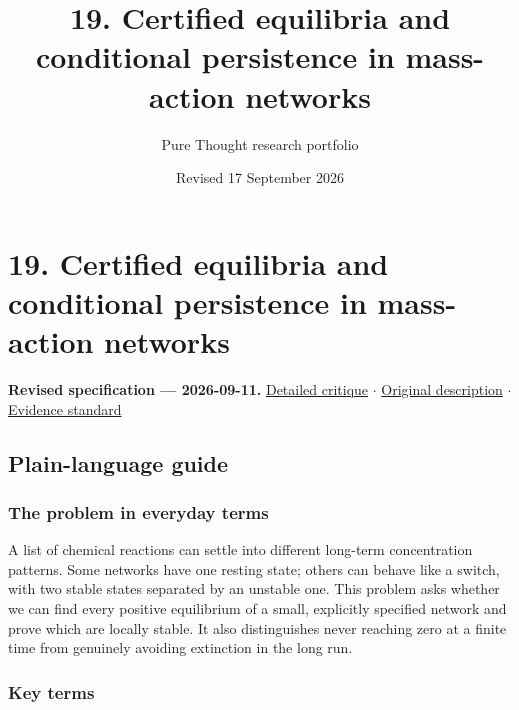 \documentclass[
  11pt,
]{article}
\title{19. Certified equilibria and conditional persistence in
mass-action networks}
\author{Pure Thought research portfolio}
\date{Revised 17 September 2026}
\begin{document}
\maketitle
\thispagestyle{empty}
\clearpage

\section{19. Certified equilibria and conditional persistence in
mass-action networks}

\textbf{Revised specification --- 2026-09-11.}
\href{https://github.com/rick-stevens-ai/Pure-Thought/blob/main/reviews/19-Chemical-Reaction-Networks.md}{Detailed
critique} \ensuremath{\cdot}
\href{https://github.com/rick-stevens-ai/Pure-Thought/blob/main/archive/original-PRDs/19-Chemical-Reaction-Networks.md}{Original
description} \ensuremath{\cdot}
\href{https://github.com/rick-stevens-ai/Pure-Thought/blob/main/reviews/EVIDENCE-STANDARD.md}{Evidence
standard}

\subsection{Plain-language guide}

\subsubsection{The problem in everyday terms}

A list of chemical reactions can settle into different long-term
concentration patterns. Some networks have one resting state; others can
behave like a switch, with two stable states separated by an unstable
one. This problem asks whether we can find every positive equilibrium of
a small, explicitly specified network and prove which are locally
stable. It also distinguishes never reaching zero at a finite time from
genuinely avoiding extinction in the long run.

\subsubsection{Key terms}
\end{document}
